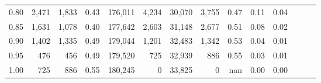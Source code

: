 \begin{tabular}{rrrrrrrrrrrrrr}
0.80 &   2,471 &  1,833 &  0.43 &  176,011 &    4,234 &  30,070 &   3,755 &  0.47 &  0.11 &      0.04 \\
0.85 &   1,631 &  1,078 &  0.40 &  177,642 &    2,603 &  31,148 &   2,677 &  0.51 &  0.08 &      0.02 \\
0.90 &   1,402 &  1,335 &  0.49 &  179,044 &    1,201 &  32,483 &   1,342 &  0.53 &  0.04 &      0.01 \\
0.95 &     476 &    456 &  0.49 &  179,520 &      725 &  32,939 &     886 &  0.55 &  0.03 &      0.01 \\
1.00 &     725 &    886 &  0.55 &  180,245 &        0 &  33,825 &       0 &   nan &  0.00 &      0.00 \\
\bottomrule
\end{tabular}
